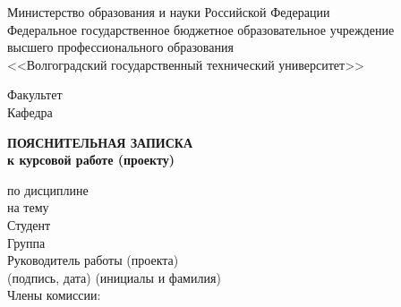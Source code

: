 \begin{titlepage}
    \begin{center}
        Министерство образования и науки Российской Федерации \\
        Федеральное государственное бюджетное образовательное учреждение\\
        высшего профессионального образования\\
        <<Волгоградский государственный технический университет>>\\
    \end{center}
    Факультет \underline{\hspace{14.7cm}}\\
    Кафедра \underline{\hspace{15.1cm}}\\
    \vspace{1cm}
    \begin{center}
        \large \MakeUppercase{\textbf{пояснительная записка}} \\
        \normalsize\vspace{-0.2cm}\textbf{к курсовой работе (проекту)}
    \end{center}
    \begin{flushleft}
        по дисциплине \underline{\hspace{13.6cm}}\\
        на тему \underline{\hspace{15.2cm}}\\
        \underline{\hspace{\textwidth}}
        Студент \underline{\hspace{20em}}\\
        Группа \underline{\hspace{10em}}\\
        Руководитель работы (проекта) \underline{\hspace{5cm}}
            \hspace{0.5cm} \underline{\hspace{4.2cm}}\\
            \vspace{-0.2cm}\hspace{8cm}\footnotesize(подпись, дата)
            \hspace{3cm}(инициалы и фамилия)\normalsize\\
            \vspace{1cm}
        Члены комиссии:\\
        \hspace{0.2cm}\underline{\hspace{5cm}}\hspace{0.5cm}\underline{\hspace{6cm}}\\

\end{flushleft}
\end{titlepage}

